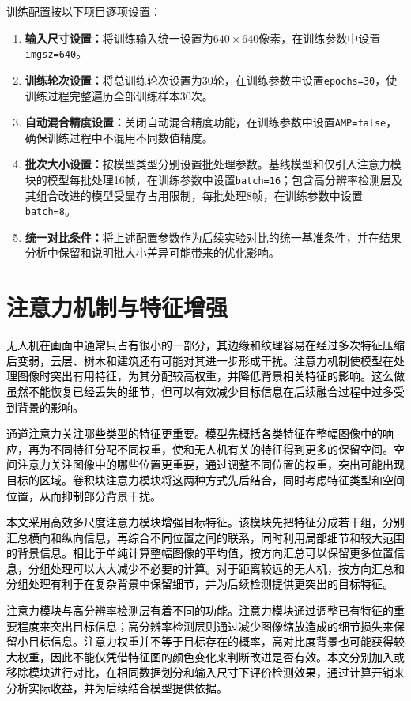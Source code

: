 训练配置按以下项目逐项设置：
\begin{enumerate}[leftmargin=2.5em,itemsep=0.3em]
    \item \textbf{输入尺寸设置：}将训练输入统一设置为$640\times640$像素，在训练参数中设置\texttt{imgsz=640}。
    \item \textbf{训练轮次设置：}将总训练轮次设置为30轮，在训练参数中设置\texttt{epochs=30}，使训练过程完整遍历全部训练样本30次。
    \item \textbf{自动混合精度设置：}关闭自动混合精度功能，在训练参数中设置\texttt{AMP=false}，确保训练过程中不混用不同数值精度。
    \item \textbf{批次大小设置：}按模型类型分别设置批处理参数。基线模型和仅引入注意力模块的模型每批处理16帧，在训练参数中设置\texttt{batch=16}；包含高分辨率检测层及其组合改进的模型受显存占用限制，每批处理8帧，在训练参数中设置\texttt{batch=8}。
    \item \textbf{统一对比条件：}将上述配置参数作为后续实验对比的统一基准条件，并在结果分析中保留和说明批大小差异可能带来的优化影响。
\end{enumerate}

\section{注意力机制与特征增强}

\textcolor{black}{无人机在画面中通常只占有很小的一部分，其边缘和纹理容易在经过多次特征压缩后变弱，云层、树木和建筑还有可能对其进一步形成干扰。注意力机制使模型在处理图像时突出有用特征，为其分配较高权重，并降低背景相关特征的影响。这么做虽然不能恢复已经丢失的细节，但可以有效减少目标信息在后续融合过程中过多受到背景的影响。}

\textcolor{black}{通道注意力关注哪些类型的特征更重要。模型先概括各类特征在整幅图像中的响应，再为不同特征分配不同权重，使和无人机有关的特征得到更多的保留空间。空间注意力关注图像中的哪些位置更重要，通过调整不同位置的权重，突出可能出现目标的区域。卷积块注意力模块将这两种方式先后结合，同时考虑特征类型和空间位置，从而抑制部分背景干扰\cite{cbam}。}

\textcolor{black}{本文采用高效多尺度注意力模块增强目标特征。该模块先把特征分成若干组，分别汇总横向和纵向信息，再综合不同位置之间的联系，同时利用局部细节和较大范围的背景信息\cite{ema}。相比于单纯计算整幅图像的平均值，按方向汇总可以保留更多位置信息，分组处理可以大大减少不必要的计算。对于距离较远的无人机，按方向汇总和分组处理有利于在复杂背景中保留细节，并为后续检测提供更突出的目标特征。}

\textcolor{black}{注意力模块与高分辨率检测层有着不同的功能。注意力模块通过调整已有特征的重要程度来突出目标信息；高分辨率检测层则通过减少图像缩放造成的细节损失来保留小目标信息。注意力权重并不等于目标存在的概率，高对比度背景也可能获得较大权重，因此不能仅凭借特征图的颜色变化来判断改进是否有效。本文分别加入或移除模块进行对比，在相同数据划分和输入尺寸下评价检测效果，通过计算开销来分析实际收益，并为后续结合模型提供依据。}

